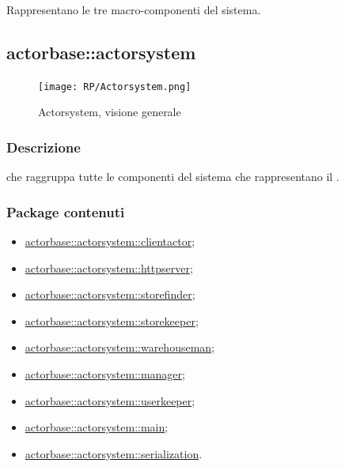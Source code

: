 \documentclass{scalatekids-article}
\begin{document}
Rappresentano le tre macro-componenti del sistema.


\subsection{actorbase::actorsystem}
\label{sec:actorbase::actorsystem}

\begin{figure}[H]
  \begin{center}
    \texttt{[image: RP/Actorsystem.png]}
    \caption{Actorsystem, visione generale}
  \end{center}
\end{figure}

\subsubsection{Descrizione}

 che raggruppa tutte le componenti del sistema che
rappresentano il .

\subsubsection{Package contenuti}

\begin{itemize}
\item \hyperref[sec:actorbase::actorsystem::clientactor]{actorbase::actorsystem::clientactor};
\item \hyperref[sec:actorbase::actorsystem::httpserver]{actorbase::actorsystem::httpserver};
\item \hyperref[sec:actorbase::actorsystem::storefinder]{actorbase::actorsystem::storefinder};
\item \hyperref[sec:actorbase::actorsystem::storekeeper]{actorbase::actorsystem::storekeeper};
\item \hyperref[sec:actorbase::actorsystem::warehouseman]{actorbase::actorsystem::warehouseman};
\item \hyperref[sec:actorbase::actorsystem::manager]{actorbase::actorsystem::manager};
\item \hyperref[sec:actorbase::actorsystem::userkeeper]{actorbase::actorsystem::userkeeper};
\item \hyperref[sec:actorbase::actorsystem::main]{actorbase::actorsystem::main};
\item \hyperref[sec:actorbase::actorsystem::serialization]{actorbase::actorsystem::serialization}.
\end{itemize}
\end{document}
